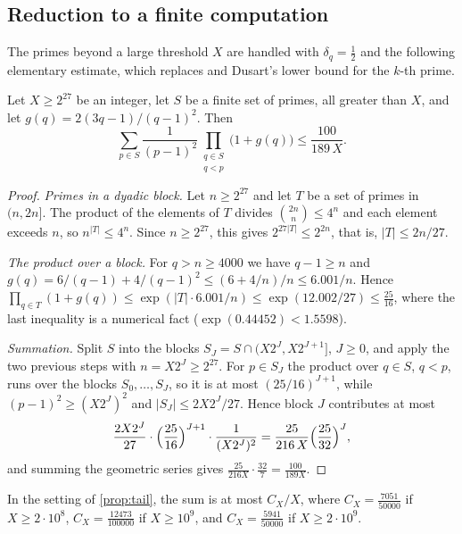 \subsection{Reduction to a finite computation}\label{sec:criterion}

The primes beyond a large threshold $X$ are handled with $\delta_q=\frac12$ and the following elementary estimate,
which replaces \cite[Theorem~6.1]{BBMST} and Dusart's lower bound for the $k$-th prime.

\begin{lemma}\label{prop:tail}
Let $X\ge2^{27}$ be an integer, let $S$ be a finite set of primes, all greater than $X$, and let
$g(q)=2(3q-1)/(q-1)^2$. Then
\[
  \sum_{p\in S}\frac{1}{(p-1)^2}\prod_{\substack{q\in S\\ q<p}}\bigl(1+g(q)\bigr)\le\frac{100}{189\,X}.
\]
\end{lemma}

\begin{proof}
\emph{Primes in a dyadic block.} Let $n\ge2^{27}$ and let $T$ be a set of primes in $(n,2n]$. The product of the
elements of $T$ divides $\binom{2n}{n}\le4^n$ and each element exceeds $n$, so $n^{|T|}\le4^n$. Since
$n\ge2^{27}$, this gives $2^{27|T|}\le2^{2n}$, that is, $|T|\le2n/27$.

\emph{The product over a block.} For $q>n\ge4000$ we have $q-1\ge n$ and
$g(q)=6/(q-1)+4/(q-1)^2\le(6+4/n)/n\le6.001/n$. Hence
$\prod_{q\in T}(1+g(q))\le\exp(|T|\cdot6.001/n)\le\exp(12.002/27)\le\frac{25}{16}$, where the last inequality is a
numerical fact ($\exp(0.44452)<1.5598$).

\emph{Summation.} Split $S$ into the blocks $S_J=S\cap(X2^J,X2^{J+1}]$, $J\ge0$, and apply the two previous steps
with $n=X2^J\ge2^{27}$. For $p\in S_J$ the product over $q\in S$, $q<p$, runs over the blocks $S_0,\dots,S_J$, so it
is at most $(25/16)^{J+1}$, while $(p-1)^2\ge(X2^J)^2$ and $|S_J|\le2X2^J/27$. Hence block $J$ contributes at most
\[
  \frac{2X2^J}{27}\cdot\Bigl(\frac{25}{16}\Bigr)^{J+1}\cdot\frac1{(X2^J)^2}
  =\frac{25}{216\,X}\Bigl(\frac{25}{32}\Bigr)^{J},
\]
and summing the geometric series gives $\frac{25}{216X}\cdot\frac{32}{7}=\frac{100}{189X}$.
\end{proof}

\begin{lemma}\label{prop:tailtwo}
In the setting of \cref{prop:tail}, the sum is at most $C_X/X$, where $C_X=\frac{7051}{50000}$ if $X\ge2\cdot10^8$,
$C_X=\frac{12473}{100000}$ if $X\ge10^9$, and $C_X=\frac{5941}{50000}$ if $X\ge2\cdot10^9$.
\end{lemma}

